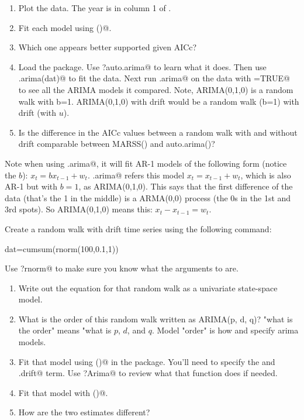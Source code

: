 \begin{hwenumerate}
\begin{enumerate}[label=\alph*)]
\item Plot the data. The year is in column 1 of \verb@grouse@.
\item Fit each model using \verb@MARSS()@.
\item Which one appears better supported given AICc?
\item Load the \verb@forecast@ package. Use \verb@?auto.arima@ to learn what it does.  Then use \verb@auto.arima(dat)@  to fit the data.  Next run \verb@auto.arima@ on the data with \verb@trace=TRUE@ to see all the ARIMA models it compared. Note, ARIMA(0,1,0) is a random walk with b=1.  ARIMA(0,1,0) with drift would be a random walk (b=1) with drift (with $u$).   
\item Is the difference in the AICc values between a random walk with and without drift comparable between MARSS() and auto.arima()?
\end{enumerate}

Note when using \verb@auto.arima@, it will fit AR-1 models of the following form (notice the $b$): $x_t = b x_{t-1}+w_t$.  \verb@auto.arima@ refers this model $x_t = x_{t-1}+w_t$, which is also AR-1 but with $b=1$, as ARIMA(0,1,0).  This says that the first difference of the data (that's the 1 in the middle) is a ARMA(0,0) process (the 0s in the 1st and 3rd spots).  So ARIMA(0,1,0) means this: $x_t - x_{t-1} = w_t$.  

\item\label{hw-uniss-2} Create a random walk with drift time series using the following command:
\begin{Schunk}
\begin{Sinput}
 dat=cumsum(rnorm(100,0.1,1))
\end{Sinput}
\end{Schunk}
Use \verb@?rnorm@ to make sure you know what the arguments to \verb@rnorm@ are.

\begin{enumerate}[label=\alph*)]
\item Write out the equation for that random walk as a univariate state-space model. 
\item What is the order of this random walk written as ARIMA(p, d, q)? "what is the order" means "what is $p$, $d$, and $q$. Model "order" is how \verb@arima@ and \verb@Arima@ specify arima models.
\item Fit that model using \verb@Arima()@ in the \verb@forecast@ package.  You'll need to specify the \verb@order@ and \verb@include.drift@ term.  Use \verb@?Arima@ to review what that function does if needed.
\item Fit that model with \verb@MARSS()@.
\item How are the two estimates different?
\end{enumerate}


\end{hwenumerate}
